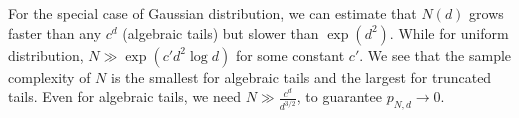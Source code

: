 \documentclass{aptpub}
\begin{document}
For the special case of Gaussian distribution, we can estimate that
$N(d)$ grows faster than any $c^d$ (algebraic tails) but slower than $\exp(d^2)$.
While for uniform distribution, $N\gg \exp(c' d^2 \log d)$ for some constant $c'$.
We see that the sample complexity of $N$ is the smallest for algebraic tails and the largest
for truncated tails. Even for algebraic tails, we need $N\gg \frac{c^d}{d^{3/2}}$,
to guarantee $p_{N,d}\to 0$.




\appendix
\end{document}
